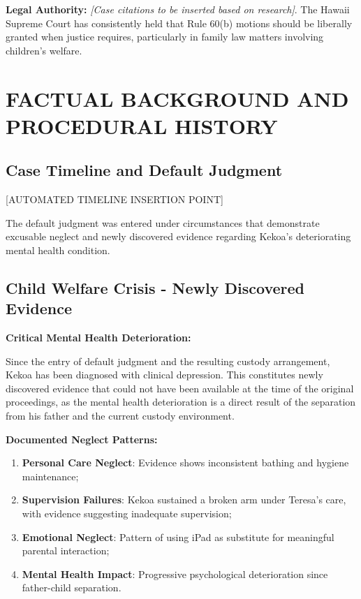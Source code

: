 \documentclass[12pt,letterpaper]{article}
\begin{document}
\textbf{Legal Authority:} \textit{[Case citations to be inserted based on research]}. The Hawaii Supreme Court has consistently held that Rule 60(b) motions should be liberally granted when justice requires, particularly in family law matters involving children's welfare.

\section{FACTUAL BACKGROUND AND PROCEDURAL HISTORY}

\subsection{Case Timeline and Default Judgment}

[AUTOMATED TIMELINE INSERTION POINT]

The default judgment was entered under circumstances that demonstrate excusable neglect and newly discovered evidence regarding Kekoa's deteriorating mental health condition.

\subsection{Child Welfare Crisis - Newly Discovered Evidence}

\textbf{Critical Mental Health Deterioration:}

Since the entry of default judgment and the resulting custody arrangement, Kekoa has been diagnosed with clinical depression. This constitutes newly discovered evidence that could not have been available at the time of the original proceedings, as the mental health deterioration is a direct result of the separation from his father and the current custody environment.

\textbf{Documented Neglect Patterns:}

\begin{enumerate}
\item \textbf{Personal Care Neglect}: Evidence shows inconsistent bathing and hygiene maintenance;
\item \textbf{Supervision Failures}: Kekoa sustained a broken arm under Teresa's care, with evidence suggesting inadequate supervision;
\item \textbf{Emotional Neglect}: Pattern of using iPad as substitute for meaningful parental interaction;
\item \textbf{Mental Health Impact}: Progressive psychological deterioration since father-child separation.
\end{enumerate}
\end{document}

